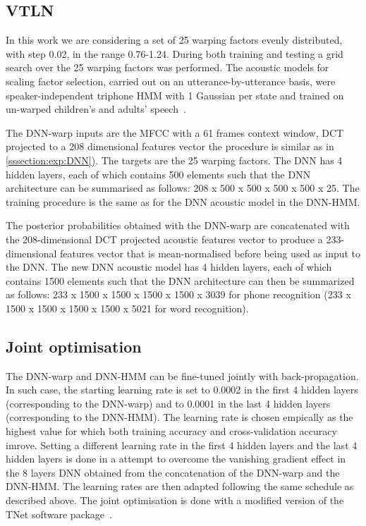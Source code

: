\documentclass{nle}
\begin{document}
\subsection{VTLN}\label{sssection:exp:VTLN}
In  this  work  we are considering  a  set   of  25  warping   factors  evenly
distributed, with step 0.02, in the range 0.76-1.24. During both training and testing
a grid search over the 25 warping factors was performed.  The acoustic
models   for   scaling   factor    selection,   carried   out   on   an
utterance-by-utterance  basis, were speaker-independent  triphone HMM
with  1 Gaussian  per state  and  trained on  un-warped children's  and
adults' speech~\citep{WelKanNey99,GerGiuBru07}.

The DNN-warp inputs are the MFCC with a 61 frames context window, DCT
projected to a 208 dimensional features vector the procedure is similar as in \ref{sssection:exp:DNN}). The targets are the 25
warping factors. The  DNN has 4 hidden layers,  each of which contains
500  elements such  that the  DNN  architecture can  be summarised  as
follows: 208 x 500  x 500 x 500 x 500 x  25. The training procedure is
the same as for the DNN  acoustic model in the DNN-HMM.  

The posterior
probabilities  obtained with  the  DNN-warp are concatenated with  the
208-dimensional DCT  projected acoustic  features vector to produce a
233-dimensional features  vector that is mean-normalised  before being used
as input to  the DNN. The new DNN acoustic model  has 4 hidden layers,
each of  which contains 1500  elements such that the  DNN architecture
can then be summarized  as follows: 233 x 1500 x 1500  x 1500 x 1500 x
3039 for phone recognition (233 x 1500 x 1500  x 1500 x 1500 x 5021 for word recognition).

\subsection{Joint optimisation}\label{sssection:exp:joint}
The DNN-warp and DNN-HMM can be fine-tuned jointly with back-propagation. In such case, the starting learning rate is set to 0.0002 in the first 4 hidden layers (corresponding to the DNN-warp) and to 0.0001 in the last 4 hidden layers (corresponding to the DNN-HMM). The learning rate is chosen empically as the highest value for which both training accuracy and cross-validation accuracy imrove. Setting a different learning rate in the first 4 hidden layers and the last 4 hidden layers is done in a attempt to overcome the vanishing gradient effect in the 8 layers DNN obtained from the concatenation of the DNN-warp and the DNN-HMM. The learning rates are then adapted following the same schedule as described above. The joint optimisation is done with a modified version of the TNet software package~\citep{vesely10}.
\end{document}
